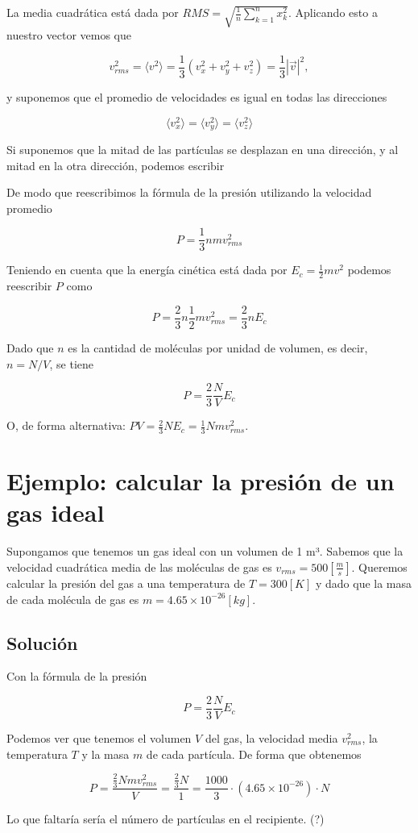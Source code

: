 \documentclass{article}
\begin{document}
La media cuadrática está dada por $RMS = \sqrt{\frac 1 n \sum_{k=1}^{n}x_k^2}$.
Aplicando esto a nuestro vector vemos que

\[
  v_{rms}^2 = \langle {v}^2 \rangle =  \frac{1}{3}\left(v_x^2+v_y^2+v_z^2\right) = \frac{1}{3} |\vec{v}|^2,
\]

y suponemos que el promedio de velocidades es igual en todas las direcciones

\[
  \langle v_x^2 \rangle = \langle v_y^2 \rangle = \langle v_z^2 \rangle
\]

Si suponemos que la mitad de las partículas se desplazan en una dirección, y al
mitad en la otra dirección, podemos escribir

De modo que reescribimos la fórmula de la presión utilizando la velocidad
promedio

\[
  P = \frac{1}{3}nmv_{rms}^2
\]

Teniendo en cuenta que la energía cinética está dada por $E_c = \frac 1 2 m
  v^2$ podemos reescribir $P$ como

\[
  P = \frac{2}{3}n\frac{1}{2}mv_{rms}^2=\frac{2}{3}nE_c
\]

Dado que $n$ es la cantidad de moléculas por unidad de volumen, es decir,
$n=N/V$, se tiene

\[
  P = \frac{2}{3}\frac{N}{V}E_c
\]

O, de forma alternativa: $PV = \frac{2}{3}NE_c=\frac{1}{3}Nmv_{rms}^2$.

\section*{Ejemplo: calcular la presión de un gas ideal}

Supongamos que tenemos un gas ideal con un volumen de 1 m³. Sabemos que la
velocidad cuadrática media de las moléculas de gas es
$v_{rms}=500\left[\frac{m}{s}\right]$. Queremos calcular la presión del gas a
una temperatura de $T=300 [K]$ y dado que la masa de cada molécula de gas es
$m=4.65\times10^{-26} [kg]$.

\subsection*{Solución}

Con la fórmula de la presión

\[
  P = \frac{2}{3}\frac{N}{V}E_c
\]

Podemos ver que tenemos el volumen $V$ del gas, la velocidad media $v_{rms}^2$,
la temperatura $T$ y la masa $m$ de cada partícula. De forma que obtenemos

\[
P=\frac{\frac{2}{3}Nmv_{rms}^2}{V}=\frac{\frac{2}{3}N}{1}
= \frac{1000}{3} \cdot(4.65\times10^{-26})\cdot N
\]

Lo que faltaría sería el número de partículas en el recipiente. (?)
\end{document}
